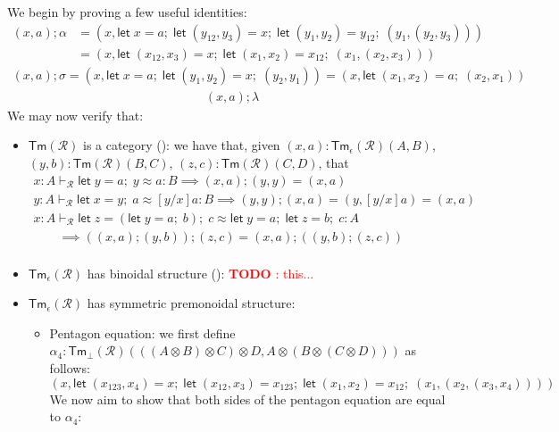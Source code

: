 \documentclass[acmsmall,screen,review]{acmart}
\newcounter{todos}
\newcommand{\todo}[1]{\stepcounter{todos} \textcolor{red}{\textbf{TODO \arabic{todos}}: #1}}
\newcommand{\mc}[1]{\ensuremath{\mathcal{#1}}}
\newcommand{\ms}[1]{\ensuremath{\mathsf{#1}}}
\newcommand{\letexpr}[3]{\ensuremath{\ms{let}\;#1 = #2;\;#3}}
\newcommand{\teqv}{\approx}
\newcommand{\tmeq}[5]{#1 \vdash_{#2} #3 \teqv #4 : {#5}}
\newcommand{\cmark}{\ding{51}}%
\begin{document}
We begin by proving a few useful identities:
\begin{align*}
  (x, a) ; \alpha 
  &= (x, 
    \letexpr{x}{a}{\letexpr{(y_{12}, y_3)}{x}{\letexpr{(y_1, y_2)}{y_{12}}{(y_1, (y_2, y_3))}}}
  ) 
    \\
  &= (x, \letexpr{(x_{12}, x_3)}{x}{\letexpr{(x_1, x_2)}{x_{12}}{(x_1, (x_2, x_3))}})
\end{align*}
\begin{align*}
  (x, a) ; \sigma 
  = (x, 
    \letexpr{x}{a}{\letexpr{(y_1, y_2)}{x}{(y_2, y_1)}}
  ) = (x, \letexpr{(x_1, x_2)}{a}{(x_2, x_1)})
\end{align*}
\begin{align*}
  (x, a) ; \lambda
\end{align*}
We may now verify that:
\begin{itemize}
  \item $\ms{Tm}(\mc{R})$ is a category (\cmark): we have that, given $(x, a) :
  \ms{Tm}_\epsilon(\mc{R})(A, B)$, $(y, b) : \ms{Tm}(\mc{R})(B, C)$, $(z, c) : \ms{Tm}(\mc{R})(C,
  D)$, that
  \begin{gather*}
  \tmeq{x : A}{\mc{R}}{\letexpr{y}{a}{y}}{a}{B} 
  \implies (x, a) ; (y, y) = (x, a) \\
  \tmeq{y : A}{\mc{R}}{\letexpr{x}{y}{a}}{[y/x]a}{B} 
  \implies (y, y) ; (x, a) = (y, [y/x]a) = (x, a) \\
  \tmeq{x : A}{\mc{R}}
    {\letexpr{z}{(\letexpr{y}{a}{b})}{c}}
    {\letexpr{y}{a}{\letexpr{z}{b}{c}}}{A} \\
  \qquad \implies ((x, a) ; (y, b)) ; (z, c) = (x, a) ; ((y, b); (z, c)) \\
  \end{gather*}
  \item $\ms{Tm}_\epsilon(\mc{R})$ has binoidal structure (\cmark): 
  \todo{this...}
  \item $\ms{Tm}_\epsilon(\mc{R})$ has symmetric premonoidal structure: 
  \begin{itemize}
    \item Pentagon equation: we first define $\alpha_4 : \ms{Tm}_\bot(\mc{R})( ((A \otimes B)
    \otimes C) \otimes D, A \otimes (B \otimes (C \otimes D)))$ as follows:
    \begin{equation*}
    (x, \letexpr{(x_{123}, x_4)}{x}{
        \letexpr{(x_{12}, x_3)}{x_{123}}{
        \letexpr{(x_1, x_2)}{x_{12}}{
          (x_1, (x_2, (x_3, x_4)))
        }}})
    \end{equation*}
    We now aim to show that both sides of the pentagon equation are equal to $\alpha_4$:

\end{itemize}
\end{itemize}
\end{document}
